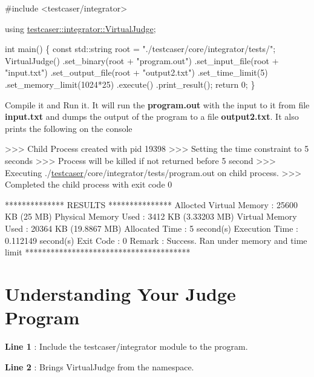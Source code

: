 \begin{DoxyCode}
\textcolor{preprocessor}{#include <testcaser/integrator>}

\textcolor{keyword}{using} \hyperlink{classtestcaser_1_1integrator_1_1VirtualJudge}{testcaser::integrator::VirtualJudge};

\textcolor{keywordtype}{int} main() \{
 \textcolor{keyword}{const} std::string root = \textcolor{stringliteral}{"./testcaser/core/integrator/tests/"};
 VirtualJudge()
   .set\_binary(root + \textcolor{stringliteral}{"program.out"})
   .set\_input\_file(root + \textcolor{stringliteral}{"input.txt"})
   .set\_output\_file(root + \textcolor{stringliteral}{"output2.txt"})
   .set\_time\_limit(5)
   .set\_memory\_limit(1024*25)
   .execute()
   .print\_result();
 \textcolor{keywordflow}{return} 0;
\}
\end{DoxyCode}
 Compile it and Run it. It will run the {\bfseries {\ttfamily program.\+out}} with the input to it from file {\bfseries {\ttfamily input.\+txt}} and dumps the output of the program to a file {\bfseries output2.\+txt}. It also prints the following on the console


\begin{DoxyCode}
>>> Child Process created with pid 19398
>>> Setting the time constraint to 5 seconds
>>> Process will be killed \textcolor{keywordflow}{if} not returned before 5 second
>>> Executing ./\hyperlink{namespacetestcaser}{testcaser}/core/integrator/tests/program.out on child process.
>>> Completed the child process with exit code 0

************** RESULTS ***************
Allocted Virtual Memory : 25600 KB (25 MB)
Physical Memory Used    : 3412 KB (3.33203 MB)
Virtual Memory Used     : 20364 KB (19.8867 MB)
Allocated Time          : 5 second(s)
Execution Time          : 0.112149 second(s)
Exit Code               : 0
Remark                  : Success. Ran under memory and time limit
***************************************
\end{DoxyCode}
 

\hypertarget{index_understanding_v_j}{}\section{Understanding Your Judge Program}\label{index_understanding_v_j}
{\bfseries Line 1 } \+: Include the {\ttfamily testcaser/integrator} module to the program.

{\bfseries Line 2 } \+: Brings Virtual\+Judge from the namespace.

